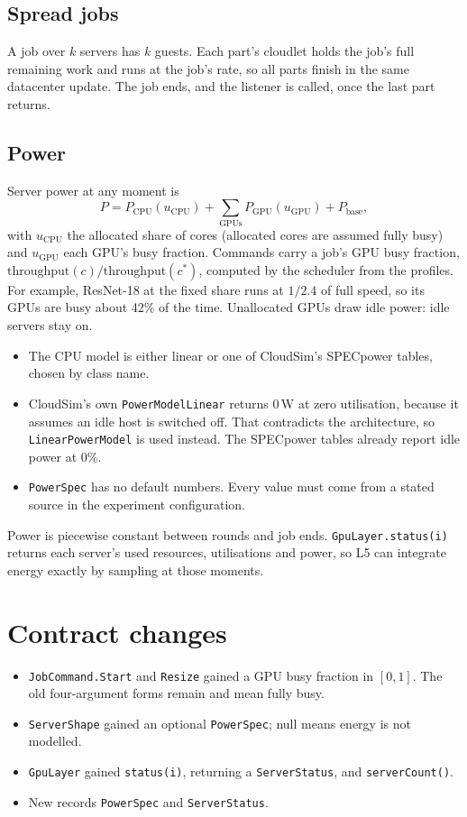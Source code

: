 \documentclass[11pt,a4paper]{article}
\newcommand{\code}[1]{\texttt{#1}}
\begin{document}
\subsection{Spread jobs}
A job over $k$ servers has $k$ guests. Each part's cloudlet holds the job's full remaining work and
runs at the job's rate, so all parts finish in the same datacenter update. The job ends, and the
listener is called, once the last part returns.

\subsection{Power}
Server power at any moment is
\[
  P = P_\text{CPU}(u_\text{CPU}) + \sum_{\text{GPUs}} P_\text{GPU}(u_\text{GPU}) + P_\text{base},
\]
with $u_\text{CPU}$ the allocated share of cores (allocated cores are assumed fully busy) and
$u_\text{GPU}$ each GPU's busy fraction. Commands carry a job's GPU busy fraction,
$\text{throughput}(c)/\text{throughput}(c^*)$, computed by the scheduler from the profiles. For
example, ResNet-18 at the fixed share runs at $1/2.4$ of full speed, so its GPUs are busy about
42\% of the time. Unallocated GPUs draw idle power: idle servers stay on.

\begin{itemize}
  \item The CPU model is either linear or one of CloudSim's SPECpower tables, chosen by class name.
  \item CloudSim's own \code{PowerModelLinear} returns 0\,W at zero utilisation, because it assumes
        an idle host is switched off. That contradicts the architecture, so \code{LinearPowerModel}
        is used instead. The SPECpower tables already report idle power at 0\%.
  \item \code{PowerSpec} has no default numbers. Every value must come from a stated source in the
        experiment configuration.
\end{itemize}

Power is piecewise constant between rounds and job ends. \code{GpuLayer.status(i)} returns each
server's used resources, utilisations and power, so L5 can integrate energy exactly by sampling at
those moments.

\section{Contract changes}
\begin{itemize}
  \item \code{JobCommand.Start} and \code{Resize} gained a GPU busy fraction in $[0, 1]$. The old
        four-argument forms remain and mean fully busy.
  \item \code{ServerShape} gained an optional \code{PowerSpec}; null means energy is not modelled.
  \item \code{GpuLayer} gained \code{status(i)}, returning a \code{ServerStatus}, and
        \code{serverCount()}.
  \item New records \code{PowerSpec} and \code{ServerStatus}.
\end{itemize}
\end{document}
